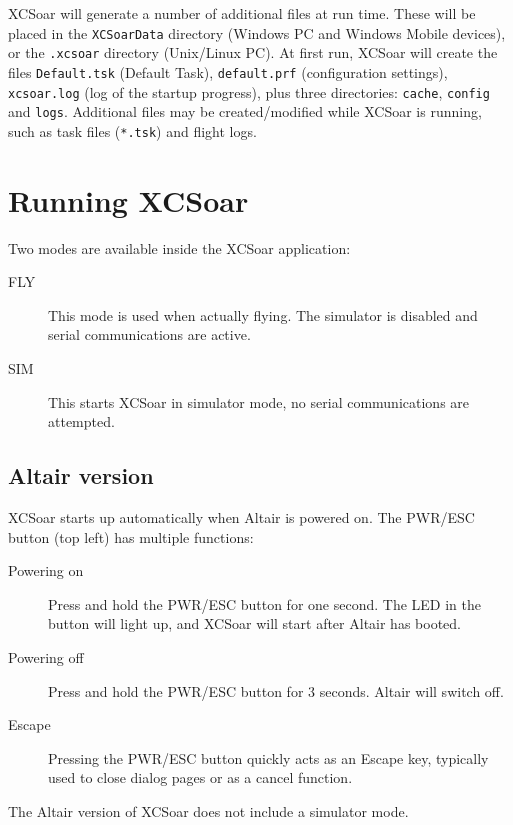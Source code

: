 XCSoar will generate a number of additional files at run time.  These
will be placed in the  \texttt{XCSoarData} directory (Windows PC and 
Windows Mobile devices), or the \texttt{.xcsoar} directory (Unix/Linux
PC).  At first run, XCSoar will create the files 
\texttt{Default.tsk} (Default Task),  \texttt{default.prf} 
(configuration settings), \newline
\texttt{xcsoar.log} (log of the startup progress), 
plus three directories: \texttt{cache},
\texttt{config} and \texttt{logs}.  Additional files may be
created/modified while XCSoar is running, such as task files
(\texttt{*.tsk}) and flight logs.


\section{Running XCSoar}

Two modes are available inside the XCSoar application: 
\begin{description}
\item[FLY] This mode is used when actually flying.  The simulator is 
  disabled and serial communications are active. 
\item[SIM] This starts XCSoar in simulator mode, no serial communications
  are attempted.
\end{description}

\subsection*{Altair version}
XCSoar starts up automatically when Altair is powered on.
The PWR/ESC button (top left) has multiple functions:
\begin{description}
\item[Powering on]  Press and hold the PWR/ESC button for one second.
  The LED in the button will light up, and XCSoar will start after
  Altair has booted.
\item[Powering off]  Press and hold the PWR/ESC button for 3 seconds.
  Altair will switch off.
\item[Escape] Pressing the PWR/ESC button quickly acts as an
Escape key, typically used to close dialog pages or as a cancel function.
\end{description}

The Altair version of XCSoar does not include a simulator mode.

